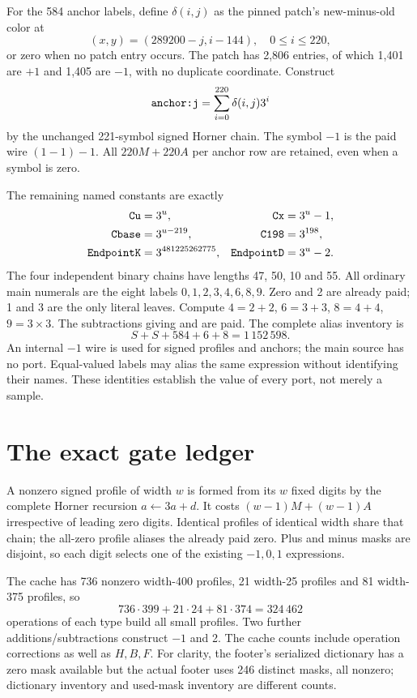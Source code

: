 \documentclass[11pt,letterpaper]{article}
\theoremstyle{definition}\newtheorem{definition}[theorem]{Definition}
\theoremstyle{remark}\newtheorem{remark}[theorem]{Remark}
\newcommand{\codem}[1]{\mbox{\normalfont\ttfamily\detokenize{#1}}}
\begin{document}
For the 584 anchor labels, define $\delta(i,j)$ as the pinned patch's new-minus-old color at
\[
 (x,y)=(289200-j,i-144),\quad 0\le i\le220,
\]
or zero when no patch entry occurs. The patch has 2,806 entries, of which 1,401 are $+1$ and 1,405 are $-1$, with no duplicate coordinate. Construct
\[
 \codem{anchor:j}=\sum_{i=0}^{220}\delta(i,j)3^i
\]
by the unchanged 221-symbol signed Horner chain. The symbol $-1$ is the paid wire $(1-1)-1$. All $220M+220A$ per anchor row are retained, even when a symbol is zero.

The remaining named constants are exactly
\begin{align*}
 \codem{Cu}&=3^u,&\codem{Cx}&=3^u-1,\\
 \codem{Cbase}&=3^{u-219},&\codem{C198}&=3^{198},\\
 \codem{EndpointK}&=3^{481225262775},&\codem{EndpointD}&=3^u-2.
\end{align*}
The four independent binary chains have lengths 47, 50, 10 and 55. All ordinary main numerals are the eight labels $0,1,2,3,4,6,8,9$. Zero and 2 are already paid; 1 and 3 are the only literal leaves. Compute $4=2+2$, $6=3+3$, $8=4+4$, $9=3\times3$. The subtractions giving \codem{Cx} and \codem{EndpointD} are paid. The complete alias inventory is
\[
 S+S+584+6+8=1\,152\,598.
\]
An internal $-1$ wire is used for signed profiles and anchors; the main source has no \codem{C:-1} port. Equal-valued labels may alias the same expression without identifying their names. These identities establish the value of every port, not merely a sample.

\section{The exact gate ledger}\label{ptr:sc:sec:ledger}
A nonzero signed profile of width $w$ is formed from its $w$ fixed digits by the complete Horner recursion $a\leftarrow3a+d$. It costs $(w-1)M+(w-1)A$ irrespective of leading zero digits. Identical profiles of identical width share that chain; the all-zero profile aliases the already paid zero. Plus and minus masks are disjoint, so each digit selects one of the existing $-1,0,1$ expressions.

The cache has 736 nonzero width-400 profiles, 21 width-25 profiles and 81 width-375 profiles, so
\[
 736\cdot399+21\cdot24+81\cdot374=324\,462
\]
operations of each type build all small profiles. Two further additions/subtractions construct $-1$ and 2. The cache counts include operation corrections as well as $H,B,F$. For clarity, the footer's serialized dictionary has a zero mask available but the actual footer uses 246 distinct masks, all nonzero; dictionary inventory and used-mask inventory are different counts.
\end{document}
